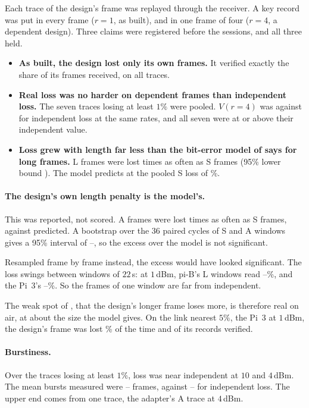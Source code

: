 Each trace of the design's frame was replayed through the receiver. A key record was put in every
frame ($r = 1$, as built), and in one frame of four ($r = 4$, a dependent design). Three claims
were registered before the sessions, and all three held.
\begin{itemize}
\item \textbf{As built, the design lost only its own frames.} It verified exactly the share of
      its frames received, on all \airTracesA{} traces.
\item \textbf{Real loss was no harder on dependent frames than independent loss.} The seven traces
      losing at least $1\%$ were pooled. $V(r = 4)$ was \airVdep{} against \airVdepIid{} for
      independent loss at the same rates, and all seven were at or above their independent value.
\item \textbf{Loss grew with length far less than the bit-error model of
       says for long frames.} L frames were lost \airLenRatio{} times as
      often as S frames (95\% lower bound \airLenRatioLo). The model predicts \airLenModel{} at
      the pooled S loss of \airLenPs\%.
\end{itemize}

\paragraph{The design's own length penalty is the model's.} This was reported, not scored. A
frames were lost \airPenalty{} times as often as S frames, against \airPenaltyModel{} predicted.
A bootstrap over the $36$ paired cycles of S and A windows gives a 95\% interval of
\airPenaltyLo--\airPenaltyHi, so the excess over the model is not significant.

Resampled frame by frame instead, the excess would have looked significant. The loss swings
between windows of $22$\,s: at $1$\,dBm, pi-B's L windows read \airSwingPiBLo--\airSwingPiBHi\%,
and the Pi~3's \airSwingPiThreeLo--\airSwingPiThreeHi\%. So the frames of one window are far from
independent.

The weak spot of , that the design's longer frame loses more, is therefore
real on air, at about the size the model gives. On the link nearest $5\%$, the Pi~3 at $1$\,dBm,
the design's frame was lost \airNearP\% of the time and \airNearV{} of its records verified.

\paragraph{Burstiness.} Over the traces losing at least $1\%$, loss was near independent at
$10$ and $4$\,dBm. The mean bursts measured were \airBurstHighLo--\airBurstHighHi{} frames,
against \airBurstHighIidLo--\airBurstHighIidHi{} for independent loss. The upper end comes from
one trace, the adapter's A trace at $4$\,dBm.


